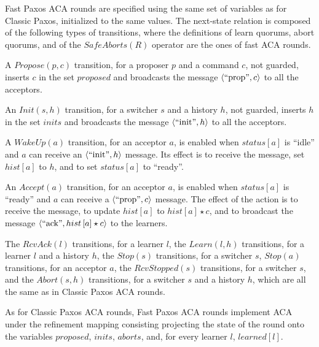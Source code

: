 Fast Paxos ACA rounds are specified using the same set of variables as for
Classic Paxos, initialized to the same values.
The next-state relation is composed of the following types of
transitions, where the definitions of learn quorums, abort quorums,
and of the $SafeAborts\left( R \right)$ operator are the ones of fast
ACA rounds.
\begin{compactitem}
    \item A $Propose\left( p,c \right)$ transition, for a proposer $p$
        and a command $c$, not guarded, inserts $c$ in the set
        $proposed$ and broadcasts the message $\left\langle\text{``prop''},c\right\rangle$ to
        all the acceptors.
    \item An $Init\left( s, h \right)$ transition, for a switcher $s$
        and a history $h$, not guarded, inserts $h$ in the set $inits$ and
        broadcasts the message $\left\langle\text{``init''},h\right\rangle$ to all the acceptors.
    \item A $WakeUp\left( a \right)$ transition, for an acceptor $a$,
        is enabled when $status\left[ a \right]$ is ``idle'' and $a$
        can receive an $\left\langle\text{``init''},h\right\rangle$ message. Its effect is to
        receive the message, set $hist\left[ a \right]$ to $h$, and to
        set $status\left[ a \right]$ to ``ready''.
    \item An $Accept\left( a \right)$ transition, for an acceptor $a$,
        is enabled when $status\left[ a \right]$ is ``ready'' and $a$
        can receive a $\left\langle\text{``prop''},c\right\rangle$ message. The effect of the
        action is to receive the message, to update $hist\left[ a
        \right]$ to $hist\left[ a \right]\star c$, and to broadcast
        the message $\left\langle\text{``ack''},hist\left[ a \right]\star c\right\rangle$ to
        the learners.
    \item The $RcvAck\left( l \right)$ transitions, for a learner $l$,
        the $Learn\left( l, h \right)$ transitions, for a learner $l$
        and a history $h$, the $Stop\left( s \right)$ transitions, for
        a switcher $s$, $Stop\left( a \right)$ transitions, for an
        acceptor $a$, the $RcvStopped\left( s \right)$ transitions,
        for a switcher $s$, and the $Abort\left( s, h \right)$
        transitions, for a switcher $s$ and a history $h$, which are
        all the same as in Classic Paxos ACA rounds.
\end{compactitem}

As for Classic Paxos ACA rounds, Fast Paxos ACA rounds implement ACA
under the refinement mapping consisting projecting the state of the
round onto the variables $proposed$, $inits$, $aborts$, and, for every
learner $l$, $learned\left[ l \right]$.


